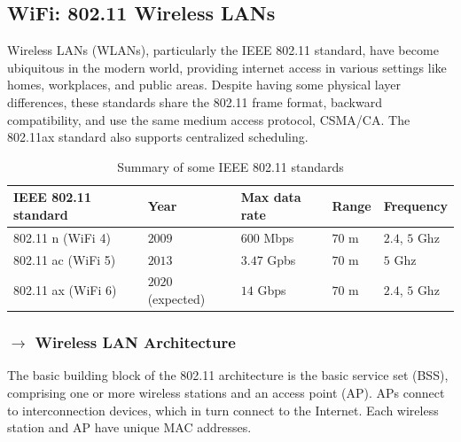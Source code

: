 \clearpage
\subsection[5.6 WiFi: 802.11 Wireless LANs]{\hspace*{0.075 em}\raisebox{0.2 em}{$\pmb{\drsh}$} WiFi: 802.11 Wireless LANs}
\label{subsec:WLAN}

Wireless LANs (WLANs), particularly the IEEE 802.11 standard, have become ubiquitous in the modern world, providing internet access in various settings like homes, workplaces, and public areas. Despite having some physical layer differences, these standards share the 802.11 frame format, backward compatibility, and use the same medium access protocol, CSMA/CA. The 802.11ax standard also supports centralized scheduling.

{
\setlength{\tabcolsep}{8pt}

\begin{table}[h!]
    \centering
    \captionsetup{justification=centering}
    \begin{tabularx}{\textwidth}{lllll}
        \toprule
        IEEE 802.11 standard & Year & Max data rate & Range & Frequency\\
        \midrule
        802.11 n (WiFi 4) & $2009$ & $600$ Mbps & $70$ m & $2.4$, $5$ Ghz \\
        802.11 ac (WiFi 5) & $2013$ & $3.47$ Gpbs & $70$ m & $5$ Ghz \\
        802.11 ax (WiFi 6) & $2020$ (expected) & $14$ Gbps & $70$ m & $2.4$, $5$ Ghz \\
        \bottomrule
    \end{tabularx}
    \caption{Summary of some IEEE 802.11 standards \cite{Kurose2017}}
    \label{tab:WiFi-standards}
\end{table}
}

\vspace{-1.5 em}
\subsubsection[5.6.1 Wireless LAN Architecture]{$\rightarrow$ Wireless LAN Architecture}

The basic building block of the 802.11 architecture is the basic service set (BSS), comprising one or more wireless stations and an access point (AP). APs connect to interconnection devices, which in turn connect to the Internet. Each wireless station and AP have unique MAC addresses.

